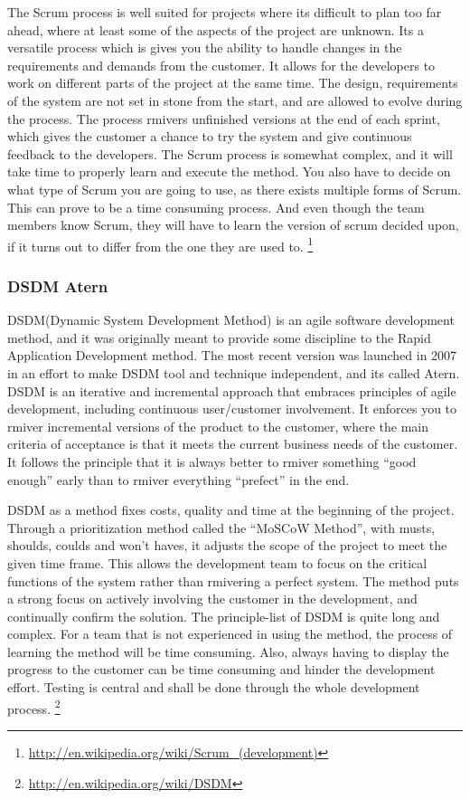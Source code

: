 The Scrum process is well suited for projects where its difficult to plan too far ahead, where at least some of the aspects of the project are unknown. Its a versatile process which is gives you the ability to handle changes in the requirements and demands from the customer. It allows for the developers to work on different parts of the project at the same time. The design, requirements of the system are not set in stone from the start, and are allowed to evolve during the process. The process rmivers unfinished versions at the end of each sprint, which gives the customer a chance to try the system and give continuous feedback to the developers. The Scrum process is somewhat complex, and it will take time to properly learn and execute the method. You also have to decide on what type of Scrum you are going to use, as there exists multiple forms of Scrum. This can prove to be a time consuming process. And even though the team members know Scrum, they will have to learn the version of scrum decided upon, if it turns out to differ from the one they are used to.
\footnote{\url{http://en.wikipedia.org/wiki/Scrum_(development)}}

\subsubsection{DSDM Atern}
DSDM(Dynamic System Development Method) is an agile software development method, and it was originally meant to provide some discipline to the Rapid Application Development method. The most recent version was launched in 2007 in an effort to make DSDM tool and technique independent, and its called Atern. DSDM is an iterative and incremental approach that embraces principles of agile development, including continuous user/customer involvement. It enforces you to rmiver incremental versions of the product to the customer, where the main criteria of acceptance is that it meets the current business needs of the customer. It follows the principle that it is always better to rmiver something “good enough” early than to rmiver everything “prefect” in the end.

DSDM as a method fixes costs, quality and time at the beginning of the project. Through a prioritization method called the “MoSCoW Method”, with musts, shoulds, coulds and won’t haves, it adjusts the scope of the project to meet the given time frame. This allows the development team to focus on the critical functions of the system rather than rmivering a perfect system. The method puts a strong focus on actively involving the customer in the development, and continually confirm the solution. The principle-list of DSDM is quite long and complex. For a team that is not experienced in using the method, the process of learning the method will be time consuming. Also, always having to display the progress to the customer can be time consuming and hinder the development effort. Testing is central and shall be done through the whole development process.
\footnote{\url{http://en.wikipedia.org/wiki/DSDM}}

